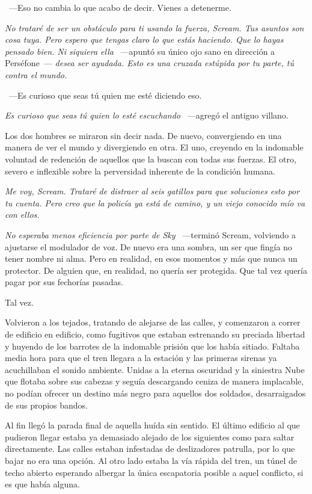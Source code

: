 ~---Eso no cambia lo que acabo de decir. Vienes a detenerme.

\emph{No trataré de ser un obstáculo para ti usando la fuerza, Scream. Tus asuntos son cosa tuya. Pero espero que tengas claro lo que estás haciendo. Que lo hayas pensado bien. Ni siquiera ella} ~---apuntó su único ojo sano en dirección a Perséfone~--- \emph{desea ser ayudada. Esto es una cruzada estúpida por tu parte, tú contra el mundo.}

~---Es curioso que seas tú quien me esté diciendo eso.

\emph{Es curioso que seas tú quien lo esté escuchando} ~---agregó el antiguo villano.

Los dos hombres se miraron sin decir nada. De nuevo, convergiendo en una manera de ver el mundo y divergiendo en otra. El uno, creyendo en la indomable voluntad de redención de aquellos que la buscan con todas sus fuerzas. El otro, severo e inflexible sobre la perversidad inherente de la condición humana.

\emph{Me voy, Scream. Trataré de distraer al seis gatillos para que soluciones esto por tu cuenta. Pero creo que la policía ya está de camino, y un viejo conocido mío va con ellos.}

\emph{No esperaba menos eficiencia por parte de Sky} ~---terminó Scream, volviendo a ajustarse el modulador de voz. De nuevo era una sombra, un ser que fingía no tener nombre ni alma. Pero en realidad, en esos momentos y más que nunca un protector. De alguien que, en realidad, no quería ser protegida. Que tal vez quería pagar por sus fechorías pasadas.

Tal vez.

\parbreak
Volvieron a los tejados, tratando de alejarse de las calles, y comenzaron a correr de edificio en edificio, como fugitivos que estaban estrenando su preciada libertad y huyendo de los barrotes de la indomable prisión que los había sitiado. Faltaba media hora para que el tren llegara a la estación y las primeras sirenas ya acuchillaban el sonido ambiente. Unidas a la eterna oscuridad y la siniestra Nube que flotaba sobre sus cabezas y seguía descargando ceniza de manera implacable, no podían ofrecer un destino más negro para aquellos dos soldados, desarraigados de sus propios bandos.

Al fin llegó la parada final de aquella huída sin sentido. El último edificio al que pudieron llegar estaba ya demasiado alejado de los siguientes como para saltar directamente. Las calles estaban infestadas de deslizadores patrulla, por lo que bajar no era una opción. Al otro lado estaba la vía rápida del tren, un túnel de techo abierto esperando albergar la única escapatoria posible a aquel conflicto, si es que había alguna.


